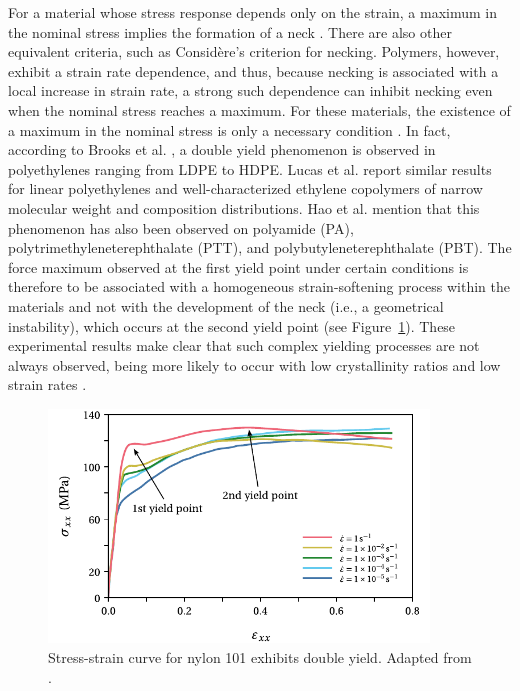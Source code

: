 For a material whose stress response depends only on the strain, a maximum in the nominal stress implies the formation of a neck \citep{wardIntroductionMechanicalProperties2004}.
There are also other equivalent criteria, such as Considère's criterion for necking.
Polymers, however, exhibit a strain rate dependence, and thus, because necking is associated with a local increase in strain rate, a strong such dependence can inhibit necking even when the nominal stress reaches a maximum.
For these materials, the existence of a maximum in the nominal stress is only a necessary condition \citep{wardIntroductionMechanicalProperties2004}.
In fact, according to Brooks et al. \citep{brooksModelingDoubleYield1995}, a double yield phenomenon is observed in polyethylenes ranging from LDPE to HDPE.
Lucas et al. \cite{lucasDoubleYieldTensile1995} report similar results for linear polyethylenes and well-characterized ethylene copolymers of narrow molecular weight and composition distributions.
Hao et al. \citep{haoRatedependentConstitutiveModel2022} mention that this phenomenon has also been observed on polyamide (PA), polytrimethyleneterephthalate (PTT), and polybutyleneterephthalate (PBT).
The force maximum observed at the first yield point under certain conditions is therefore to be associated with a homogeneous strain-softening process within the materials and not with the development of the neck (i.e., a geometrical instability), which occurs at the second yield point (see Figure~\ref{fig:double_yield}).
These experimental results make clear that such complex yielding processes are not always observed, being more likely to occur with low crystallinity ratios and low strain rates \citep{zengConstitutiveModelSemicrystalline2010}.
\begin{figure}[htbp]
    \centering
    \includegraphics[width=0.9\textwidth]{figures/double_yield}
    \caption{Stress-strain curve for nylon 101 exhibits double yield. Adapted from \cite{khanThermomechanicalResponseNylon2006}.}
\label{fig:double_yield}
\end{figure}

